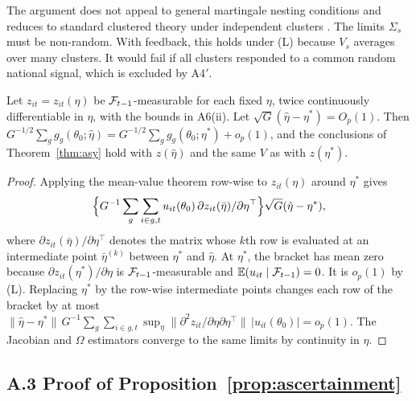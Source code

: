 \noindent The argument does not appeal to general martingale nesting conditions
\citep{hall1980martingale} and reduces to standard clustered theory under independent clusters
\citep{hansen2019clustered}. The limits $\Sigma_s$ must be non-random. With feedback, this holds under (L) because
$V_s$ averages over many clusters. It would fail if all clusters responded to a common random
national signal, which is excluded by A4$'$.

\begin{lemma}
\label{lem:generated}
Let $z_{it}=z_{it}(\eta)$ be $\mathcal{F}_{t-1}$-measurable for each fixed $\eta$, twice continuously
differentiable in $\eta$, with the bounds in A6(ii). Let $\sqrt G(\hat\eta-\eta^*)=O_p(1)$. Then
$G^{-1/2}\sum_gg_g(\theta_0;\hat\eta)=G^{-1/2}\sum_gg_g(\theta_0;\eta^*)+o_p(1)$, and the conclusions of
Theorem~\ref{thm:asy} hold with $z(\hat\eta)$ and the same $V$ as with $z(\eta^*)$.
\end{lemma}

\begin{proof}
Applying the mean-value theorem row-wise to $z_{it}(\eta)$ around $\eta^*$ gives
\begin{equation*}
\Bigl\{G^{-1}\sum_g\sum_{i\in g,t}u_{it}(\theta_0)\,\partial z_{it}(\bar\eta)/\partial\eta^{\top}\Bigr\}\sqrt G(\hat\eta-\eta^*),
\end{equation*}
where $\partial z_{it}(\bar\eta)/\partial\eta^{\top}$ denotes the matrix whose $k$th row is evaluated
at an intermediate point $\bar\eta^{(k)}$ between $\eta^*$ and $\hat\eta$.
At $\eta^*$, the bracket has mean zero because $\partial z_{it}(\eta^*)/\partial\eta$ is
$\mathcal{F}_{t-1}$-measurable and $\mathbb{E}(u_{it}\mid\mathcal{F}_{t-1})=0$. It is $o_p(1)$ by (L). Replacing $\eta^*$ by the row-wise intermediate points
changes each row of the bracket by at most $\|\hat\eta-\eta^*\|\,G^{-1}\sum_g\sum_{i\in g,t}\sup_\eta\|\partial^2z_{it}/\partial\eta\partial\eta^{\top}\|\,|u_{it}(\theta_0)|=o_p(1)$.
The Jacobian and $\Omega$ estimators converge to the same limits by continuity in $\eta$.
\end{proof}

\subsection{A.3 Proof of Proposition~\ref{prop:ascertainment}}

